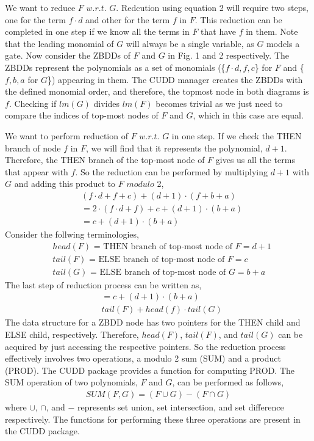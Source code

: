\documentclass{article}
\begin{document}
\par We want to reduce $F$ $w.r.t.$ $G$. Redcution using equation 2 will require two steps, one for the term $f\cdot d$ and other for the term $f$ in $F$. This reduction can be completed in one step if we know all the terms in $F$ that have $f$ in them. Note that the leading monomial of $G$ will always be a single variable, as $G$ models a gate. Now consider the ZBDDs of $F$ and $G$ in Fig. 1 and 2 respectively. The ZBDDs represent the polynomials as a set of monomials (\{$f\cdot d, f,c$\} for $F$ and \{$f,b,a$ for $G$\}) appearing in them. The CUDD manager creates the ZBDDs with the defined monomial order, and therefore, the topmost node in both diagrams is $f$. Checking if $lm(G)$ divides $lm(F)$ becomes trivial as we just need to compare the indices of top-most nodes of $F$ and $G$, which in this case are equal. 
\par We want to perform reduction of $F$ $w.r.t.$ $G$ in one step. If we check the THEN branch of node $f$ in $F$, we will find that it represents the polynomial, $d + 1$. Therefore, the THEN branch of the top-most node of $F$ gives us all the terms that appear with $f$. So the reduction can be performed by multiplying $d + 1$ with $G$ and adding this product to $F$ $modulo$ 2,
\begin{align*}
& (f\cdot d + f + c) + (d + 1)\cdot(f + b + a) \\
&= 2\cdot(f\cdot d + f) + c + (d+1)\cdot(b + a) \\
&= c + (d+1)\cdot(b + a) 
\end{align*}
Consider the follwing terminologies,
\begin{align*}
& \text{$head(F)$ = THEN branch of top-most node of $F$} = d + 1\\
& \text{$tail(F)$ = ELSE branch of top-most node of $F$} = c\\
& \text{$tail(G)$ = ELSE branch of top-most node of $G$} = b + a
\end{align*}
The last step of reduction process can be written as,
\begin{align*}
&= c + (d+1)\cdot(b + a) \\
& tail(F) + head(f)\cdot tail(G)
\end{align*}
The data structure for a ZBDD node has two pointers for the THEN child and ELSE child, respectively. Therefore, $head(F)$, $tail(F)$, and $tail(G)$ can be acquired by just accessing the respective pointers. So the reduction process effectively involves two operations, a modulo 2 sum (SUM) and a product (PROD). The CUDD package provides a function for computing PROD. The SUM operation of two polynomials, $F$ and $G$, can be performed as follows,
\begin{align*}
SUM(F,G) = (F \cup G) - (F \cap G) 
\end{align*} 
where $\cup$, $\cap$, and $-$ represents set union, set intersection, and set difference respectively. The functions  for performing these three operations are present in the CUDD package.
\end{document}
